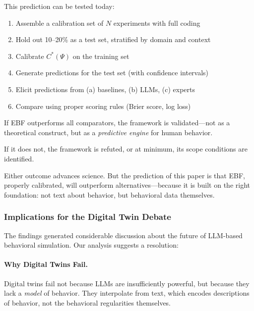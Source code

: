 This prediction can be tested today:
\begin{enumerate}
    \item Assemble a calibration set of $N$ experiments with full coding
    \item Hold out 10--20\% as a test set, stratified by domain and context
    \item Calibrate $C^*(\Psi)$ on the training set
    \item Generate predictions for the test set (with confidence intervals)
    \item Elicit predictions from (a) baselines, (b) LLMs, (c) experts
    \item Compare using proper scoring rules (Brier score, log loss)
\end{enumerate}

If EBF outperforms all comparators, the framework is validated---not as
a theoretical construct, but as a \emph{predictive engine} for human behavior.

If it does not, the framework is refuted, or at minimum, its scope conditions
are identified.

Either outcome advances science. But the prediction of this paper is that
EBF, properly calibrated, will outperform alternatives---because it is
built on the right foundation: not text about behavior, but behavioral data
themselves.


\subsubsection{Implications for the Digital Twin Debate}

The \citet{peng2025} findings generated considerable discussion about the
future of LLM-based behavioral simulation. Our analysis suggests a resolution:

\paragraph{Why Digital Twins Fail.}
Digital twins fail not because LLMs are insufficiently powerful, but because
they lack a \emph{model} of behavior. They interpolate from text, which
encodes descriptions of behavior, not the behavioral regularities themselves.

